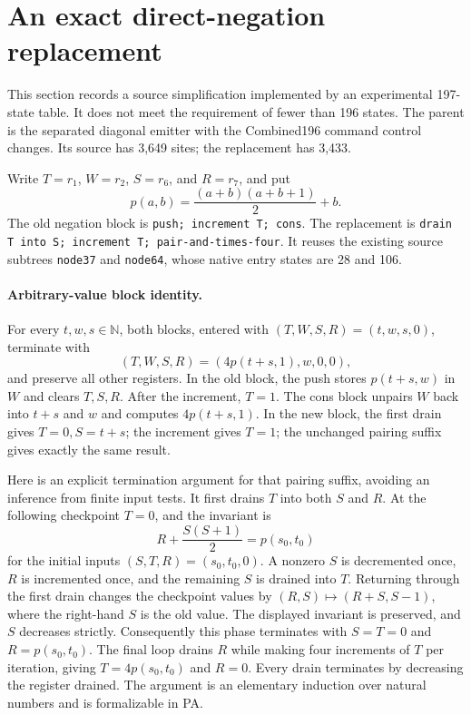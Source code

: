 \section{An exact direct-negation replacement}
This section records a source simplification implemented by an experimental
197-state table. It does not meet the requirement of fewer than 196 states.
The parent is the separated diagonal emitter with the Combined196 command
control changes. Its source has 3,649 sites; the replacement has 3,433.

Write $T=r_1$, $W=r_2$, $S=r_6$, and $R=r_7$, and put
\[
 p(a,b)=\frac{(a+b)(a+b+1)}2+b.
\]
The old negation block is \texttt{push; increment T; cons}. The replacement
is \texttt{drain T into S; increment T; pair-and-times-four}.
It reuses the existing source subtrees \texttt{node37} and \texttt{node64},
whose native entry states are 28 and 106.

\paragraph{Arbitrary-value block identity.}
For every $t,w,s\in\mathbb N$, both blocks, entered with
$(T,W,S,R)=(t,w,s,0)$, terminate with
\[
 (T,W,S,R)=(4p(t+s,1),w,0,0),
\]
and preserve all other registers. In the old block, the push stores
$p(t+s,w)$ in $W$ and clears $T,S,R$. After the increment, $T=1$.
The cons block unpairs $W$ back into $t+s$ and $w$ and computes $4p(t+s,1)$.
In the new block, the first drain gives $T=0,S=t+s$; the increment gives
$T=1$; the unchanged pairing suffix gives exactly the same result.

Here is an explicit termination argument for that pairing suffix, avoiding
an inference from finite input tests. It first drains $T$ into both $S$ and
$R$. At the following checkpoint $T=0$, and the invariant is
\[
 R+\frac{S(S+1)}2=p(s_0,t_0)
\]
for the initial inputs $(S,T,R)=(s_0,t_0,0)$. A nonzero $S$ is decremented
once, $R$ is incremented once, and the remaining $S$ is drained into $T$.
Returning through the first drain changes the checkpoint values by
$(R,S)\mapsto(R+S,S-1)$, where the right-hand $S$ is the old value.
The displayed invariant is preserved, and $S$ decreases strictly.
Consequently this phase terminates with $S=T=0$ and $R=p(s_0,t_0)$.
The final loop drains $R$ while making four increments of $T$ per iteration,
giving $T=4p(s_0,t_0)$ and $R=0$. Every drain terminates by decreasing the
register drained. The argument is an elementary induction over natural
numbers and is formalizable in PA.

